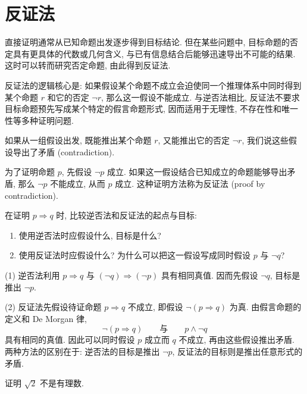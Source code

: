 \documentclass[usesamecnt, thmcnt=section, lang=cn, newtx, 10pt, scheme=chinese]{elegantbook}
\begin{document}
\section{反证法}

直接证明通常从已知命题出发逐步得到目标结论. 但在某些问题中, 目标命题的否定具有更具体的代数或几何含义, 与已有信息结合后能够迅速导出不可能的结果. 这时可以转而研究否定命题, 由此得到反证法.

反证法的逻辑核心是: 如果假设某个命题不成立会迫使同一个推理体系中同时得到某个命题 $r$ 和它的否定 $\neg r$, 那么这一假设不能成立. 与逆否法相比, 反证法不要求目标命题预先写成某个特定的假言命题形式, 因而适用于无理性, 不存在性和唯一性等多种证明问题.

\begin{definition}
如果从一组假设出发, 既能推出某个命题 $r$, 又能推出它的否定 $\neg r$, 我们说这些假设导出了{\color{blue}矛盾 (contradiction)}.

为了证明命题 $p$, 先假设 $\neg p$ 成立. 如果这一假设结合已知成立的命题能够导出矛盾, 那么 $\neg p$ 不能成立, 从而 $p$ 成立. 这种证明方法称为{\color{blue}反证法 (proof by contradiction)}.
\end{definition}

\begin{concept}
\label{con:logic-10}
在证明 $p\Rightarrow q$ 时, 比较逆否法和反证法的起点与目标:
\begin{enumerate}[label=\rm(\arabic*)]
  \item 使用逆否法时应假设什么, 目标是什么?
  \item 使用反证法时应假设什么? 为什么可以把这一假设写成同时假设 $p$ 与 $\neg q$?
\end{enumerate}
\end{concept}

\begin{solution}
(1) 逆否法利用 $p\Rightarrow q$ 与 $(\neg q)\Rightarrow(\neg p)$ 具有相同真值. 因而先假设 $\neg q$, 目标是推出 $\neg p$.

(2) 反证法先假设待证命题 $p\Rightarrow q$ 不成立, 即假设 $\neg(p\Rightarrow q)$ 为真. 由假言命题的定义和 De Morgan 律,
\[
 \neg(p\Rightarrow q)
 \qquad\text{与}\qquad
 p\wedge\neg q
\]
具有相同的真值. 因此可以同时假设 $p$ 成立而 $q$ 不成立, 再由这些假设推出矛盾. 两种方法的区别在于: 逆否法的目标是推出 $\neg p$, 反证法的目标则是推出任意形式的矛盾.
\end{solution}

\begin{example}\label{ex:sqrt2}
证明 $\sqrt2$ 不是有理数.
\end{example}
\end{document}
